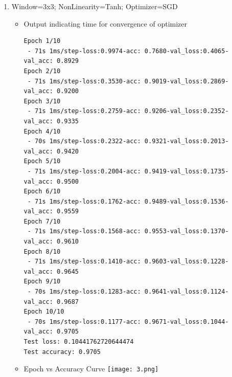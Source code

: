 \documentclass{article}
\begin{document}
\begin{enumerate}
\item Window=3x3; NonLinearity=Tanh; Optimizer=SGD
\begin{itemize}
    \item Output indicating time for convergence of optimizer\newline
    \begin{verbatim}
Epoch 1/10
 - 71s 1ms/step-loss:0.9974-acc: 0.7680-val_loss:0.4065-val_acc: 0.8929
Epoch 2/10
 - 71s 1ms/step-loss:0.3530-acc: 0.9019-val_loss:0.2869-val_acc: 0.9200
Epoch 3/10
 - 71s 1ms/step-loss:0.2759-acc: 0.9206-val_loss:0.2352-val_acc: 0.9335
Epoch 4/10
 - 70s 1ms/step-loss:0.2322-acc: 0.9321-val_loss:0.2013-val_acc: 0.9420
Epoch 5/10
 - 71s 1ms/step-loss:0.2004-acc: 0.9419-val_loss:0.1735-val_acc: 0.9500
Epoch 6/10
 - 71s 1ms/step-loss:0.1762-acc: 0.9489-val_loss:0.1536-val_acc: 0.9559
Epoch 7/10
 - 71s 1ms/step-loss:0.1568-acc: 0.9553-val_loss:0.1370-val_acc: 0.9610
Epoch 8/10
 - 71s 1ms/step-loss:0.1410-acc: 0.9603-val_loss:0.1228-val_acc: 0.9645
Epoch 9/10
 - 70s 1ms/step-loss:0.1283-acc: 0.9641-val_loss:0.1124-val_acc: 0.9687
Epoch 10/10
 - 70s 1ms/step-loss:0.1177-acc: 0.9671-val_loss:0.1044-val_acc: 0.9705
Test loss: 0.10441762720644474
Test accuracy: 0.9705
\end{verbatim}
    \item Epoch vs Accuracy Curve\newline
    \texttt{[image: 3.png]}
\end{itemize}


\end{enumerate}
\end{document}
